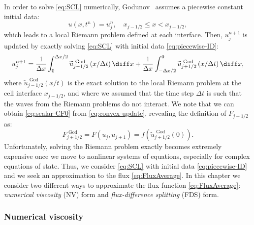 In order to solve \eqref{eq:SCL} numerically, Godunov~\cite{god59} assumes a piecewise constant initial data:
\begin{equation} \label{eq:piecewise-ID}
u(x,t^n) = u_j^n, \quad x_{j-1/2} \leq x < x_{j+1/2},
\end{equation}
which leads to a local Riemann problem defined at each interface. Then, $ u_j^{n+1} $ is updated by exactly solving \eqref{eq:SCL} with initial data \eqref{eq:piecewise-ID}:
\begin{equation} \label{eq:convex-update}
u_j^{n+1} = 
\frac{1}{\Delta x} 
\int_{0}^{\Delta x/2} \widetilde{u}_{j-1/2}^\text{~God} \left( x/ \Delta t \right) \diff x + \frac{1}{\Delta x} 
\int_{-\Delta x/2}^{0} \widetilde{u}_{j+1/2}^\text{~God} \left( x/ \Delta t \right) \diff x,
\end{equation}
where $ \widetilde{u}_{j-1/2}^\text{~God} \left( x/t \right) $ is the exact solution to the local Riemann problem at the cell interface $ x_{j-1/2} $, and where we assumed that the time step $ \Delta t $ is such that the waves from the Riemann problems do not interact. We note that we can obtain \eqref{eq:scalar-CF0} from \eqref{eq:convex-update}, revealing the definition of $ F_{j+1/2} $ as:
\begin{equation}
F_{j+1/2}^\text{~God} = F (u_{j} , u_{j+1}) = f \left( \widetilde{u}_{j+1/2}^\text{~God}(0) \right).
\end{equation}
Unfortunately, solving the Riemann problem exactly becomes extremely expensive once we move to nonlinear systems of equations, especially for complex equations of state. Thus, we consider \eqref{eq:SCL} with initial data \eqref{eq:piecewise-ID} and we seek an approximation to the flux \eqref{eq:FluxAverage}. In this chapter we consider two different ways to approximate the flux function \eqref{eq:FluxAverage}: \textit{numerical viscosity} (NV) form and \textit{flux-difference splitting} (FDS) form. 

\subsubsection*{Numerical viscosity}


